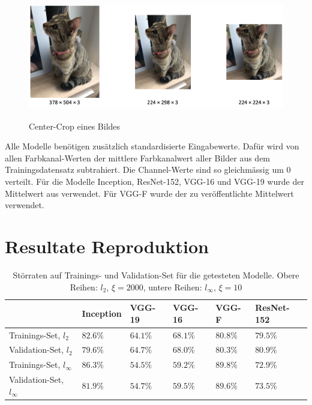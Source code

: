 \documentclass{FFHS_Thesis_Additions/ffhsthesis}
\begin{document}
\begin{figure}[h]
\caption{Center-Crop eines Bildes}
\centering
\includegraphics[width=\textwidth]{./images/image_resize.png}
\label{fig_preprocessing}
\end{figure}


Alle Modelle benötigen zusätzlich standardisierte Eingabewerte. 
Dafür wird von allen Farbkanal-Werten der mittlere Farbkanalwert aller Bilder aus dem Trainingsdatensatz subtrahiert. 
Die Channel-Werte sind so gleichmässig um $0$ verteilt. 
Für die Modelle Inception, ResNet-152, VGG-16 und VGG-19 wurde der Mittelwert aus \cite{martin_abadi_tensorflow_2015} verwendet. 
Für VGG-F wurde der zu \cite{chatfield_return_2014} veröffentlichte Mittelwert verwendet.






\chapter{Resultate Reproduktion}
\label{c_resultate_reprod}


\begin{table}[]
\centering
\caption{Störraten auf Trainings- und Validation-Set für die getesteten Modelle. Obere Reihen: $l_2$, $\xi=2000$, untere Reihen: $l_\infty$, $\xi=10$}
\begin{tabular}{|l|l|l|l|l|l|}
\hline

		            	& Inception	&	VGG-19		&	VGG-16		&	VGG-F	&	ResNet-152	\\ \hline
Trainings-Set, $l_2$		& $82.6\%$	&	$64.1\%$	&	$68.1\%$	&	$80.8\%$	& $79.5\%$	\\
Validation-Set, $l_2$ 			& $79.6\%$	&	$64.7\%$	&	$68.0\%$	&	$80.3\%$	& $80.9\%$	\\ \hline
Trainings-Set, $l_\infty$	& $86.3\%$	&	$54.5\%$	&	$59.2\%$	&	$89.8\%$	& $72.9\%$	\\
Validation-Set, $l_\infty$		& $81.9\%$	&	$54.7\%$	&	$59.5\%$	&	$89.6\%$	& $73.5\%$	\\

\hline 
\end{tabular}
\label{tbl_stoerraten_reprod}
\end{table}
\end{document}
